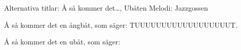 \begin{song}

\begin{songmeta}
Alternativa titlar: Å så kommer det\ldots, Ubåten
Melodi: Jazzgossen
\end{songmeta}

\begin{songtext}
Å så kommer det en ångbåt,
som säger:
TUUUUUUUUUUUUUUUUUUT.

Å så kommer det en ubåt,
som säger:
\end{songtext}
\end{song}
